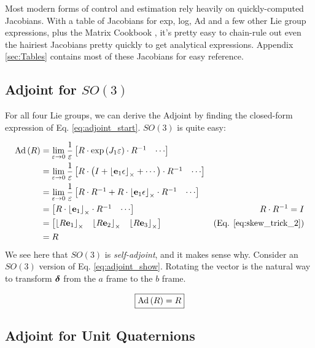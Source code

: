 Most modern forms of control and estimation rely heavily on quickly-computed
Jacobians. With a table of Jacobians for exp, log, Ad and a few other
Lie group expressions, plus the Matrix Cookbook \cite{Petersen2012},
it's pretty easy to chain-rule out even the hairiest Jacobians pretty
quickly to get analytical expressions. Appendix \ref{sec:Tables}
contains most of these Jacobians for easy reference.

\subsection{Adjoint for $SO(3)$}

For all four Lie groups, we can derive the Adjoint by finding the
closed-form expression of Eq. \ref{eq:adjoint_start}. $SO(3)$
is quite easy:

\begin{align*}
\textnormal{Ad}\left(R\right) & =\lim_{\varepsilon\to0}\frac{1}{\varepsilon}\begin{bmatrix}R\cdot\exp\left(J_{1}\varepsilon\right)\cdot R^{-1} & \cdots\end{bmatrix}\\
 & =\lim_{\varepsilon\to0}\frac{1}{\varepsilon}\begin{bmatrix}R\cdot\left(I+\left\lfloor\mathbf{e}_{1}\epsilon\right\rfloor_{\times}+\cdots\right)\cdot R^{-1} & \cdots\end{bmatrix}\\
 & =\lim_{\varepsilon\to0}\frac{1}{\varepsilon}\begin{bmatrix}R\cdot R^{-1}+R\cdot\left\lfloor\mathbf{e}_{1}\epsilon\right\rfloor_{\times}\cdot R^{-1} & \cdots\end{bmatrix}\\
 & =\begin{bmatrix}R\cdot\left\lfloor\mathbf{e}_{1}\right\rfloor_{\times}\cdot R^{-1} & \cdots\end{bmatrix} & R\cdot R^{-1}=I\\
 & =\begin{bmatrix}\left\lfloor R\mathbf{e}_{1}\right\rfloor_{\times} & \left\lfloor R\mathbf{e}_{2}\right\rfloor_{\times} & \left\lfloor R\mathbf{e}_{3}\right\rfloor_{\times}\end{bmatrix} & \textnormal{(Eq. \ref{eq:skew_trick_2})}\\
 & =R
\end{align*}
We see here that $SO(3)$ is \emph{self-adjoint}, and
it makes sense why. Consider an $SO(3)$ version of Eq.
\ref{eq:adjoint_show}. Rotating the vector is the natural way to
transform $\boldsymbol{\delta}$ from the $a$ frame to the $b$ frame.

\[
\boxed{\textnormal{Ad}\left(R\right)=R}
\]


\subsection{Adjoint for Unit Quaternions}


